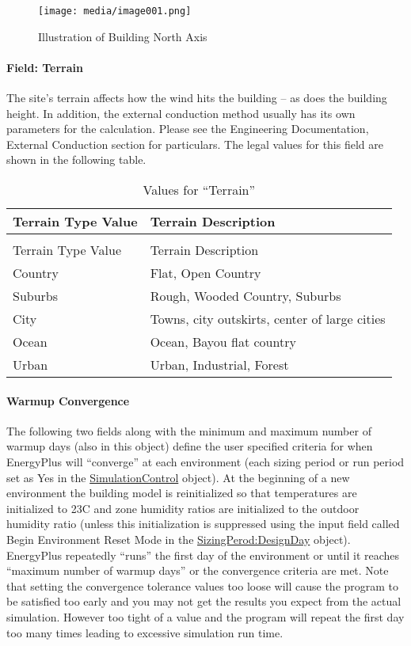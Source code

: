 \begin{figure}[hbtp] %
    \centering
    \texttt{[image: media/image001.png]}
    \caption{Illustration of Building North Axis \protect \label{fig:illustration-of-building-north-axis}}
\end{figure}

\paragraph{Field: Terrain}\label{field-terrain}

The site's terrain affects how the wind hits the building -- as does the building height. In addition, the external conduction method usually has its own parameters for the calculation. Please see the Engineering Documentation, External Conduction section for particulars. The legal values for this field are shown in the following table.

\begin{longtable}[c]{@{}ll@{}}
    \caption{Values for ``Terrain'' \label{table:values-for-terrain}} \tabularnewline
    \toprule
    Terrain Type Value & Terrain Description \tabularnewline
    \midrule
    \endfirsthead

    \caption[]{Values for ``Terrain''} \tabularnewline
    \toprule
    Terrain Type Value & Terrain Description \tabularnewline
    \midrule
    \endhead

    Country & Flat, Open Country \tabularnewline
    Suburbs & Rough, Wooded Country, Suburbs \tabularnewline
    City & Towns, city outskirts, center of large cities \tabularnewline
    Ocean & Ocean, Bayou flat country \tabularnewline
    Urban & Urban, Industrial, Forest \tabularnewline
    \bottomrule
\end{longtable}

\paragraph{Warmup Convergence}\label{warmup-convergence}

The following two fields along with the minimum and maximum number of warmup days (also in this object) define the user specified criteria for when EnergyPlus will ``converge'' at each environment (each sizing period or run period set as Yes in the \hyperref[simulationcontrol]{SimulationControl} object). At the beginning of a new environment the building model is reinitialized so that temperatures are initialized to 23C and zone humidity ratios are initialized to the outdoor humidity ratio  (unless this initialization is suppressed using the input field called Begin Environment Reset Mode in the \hyperref[sizingperioddesignday]{SizingPerod:DesignDay} object). EnergyPlus repeatedly ``runs'' the first day of the environment or until it reaches ``maximum number of warmup days'' or the convergence criteria are met. Note that setting the convergence tolerance values too loose will cause the program to be satisfied too early and you may not get the results you expect from the actual simulation. However too tight of a value and the program will repeat the first day too many times leading to excessive simulation run time.

